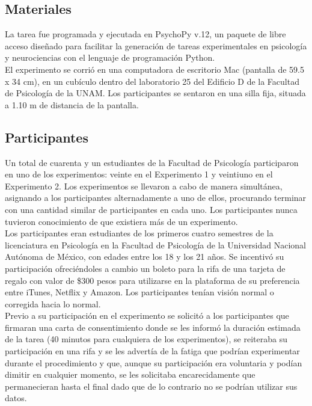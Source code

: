\begin{itemize}
\subsection{Materiales}

La tarea fue programada y ejecutada en PsychoPy v.12, un paquete de libre acceso diseñado para facilitar la generación de tareas experimentales en psicología y neurociencias con el lenguaje de programación Python.\\

El experimento se corrió en una computadora de escritorio Mac (pantalla de 59.5 x 34 cm), en un cubículo dentro del laboratorio 25 del Edificio D de la Facultad de Psicología de la UNAM. Los participantes se sentaron en una silla fija, situada a 1.10 m de distancia de la pantalla.\\ 


\subsection{Participantes}

Un total de cuarenta y un estudiantes de la Facultad de Psicología participaron en uno de los experimentos: veinte en el Experimento 1 y veintiuno en el Experimento 2. Los experimentos se llevaron a cabo de manera simultánea, asignando a los participantes alternadamente a uno de ellos, procurando terminar con una cantidad similar de participantes en cada uno. Los participantes nunca tuvieron conocimiento de que existiera más de un experimento.\\

Los participantes eran estudiantes de los primeros cuatro semestres de la licenciatura en Psicología en la Facultad de Psicología de la Universidad Nacional Autónoma de México, con edades entre los 18 y los 21 años. Se incentivó su participación ofreciéndoles a cambio un boleto para la rifa de una tarjeta de regalo con valor de \$300 pesos para utilizarse en la plataforma de su preferencia entre iTunes, Netflix y Amazon. Los participantes tenían visión normal o corregida hacia lo normal.\\ 

Previo a su participación en el experimento se solicitó a los participantes que firmaran una carta de consentimiento donde se les informó la duración estimada de la tarea (40 minutos para cualquiera de los experimentos), se reiteraba su participación en una rifa y se les advertía de la fatiga que podrían experimentar durante el procedimiento y que, aunque su participación era voluntaria y podían dimitir en cualquier momento, se les solicitaba encarecidamente que permanecieran hasta el final dado que de lo contrario no se podrían utilizar sus datos.\\


\end{itemize}
